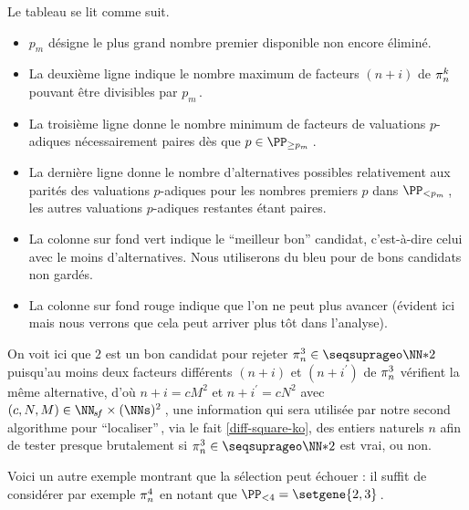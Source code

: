 Le tableau se lit comme suit.
%
\begin{itemize}
	\item $p_m$ désigne le plus grand nombre premier disponible non encore éliminé.

	\item La deuxième ligne indique le nombre maximum de facteurs $(n+i)$ de $\consprod$ pouvant être divisibles par $p_m$\,.

	\item La troisième ligne donne le nombre minimum de facteurs de valuations $p$-adiques nécessairement paires dès que $p \in \PP_{\geq p_m}$\,.

	\item La dernière ligne donne le nombre d'alternatives possibles relativement aux parités des valuations $p$-adiques pour les nombres premiers $p$ dans $\PP_{< p_m}$\,, les autres valuations $p$-adiques restantes étant paires.

	\item La colonne sur fond vert indique le \enquote{meilleur bon} candidat, c'est-à-dire celui avec le moins d'alternatives.
	Nous utiliserons du bleu pour de bons candidats non gardés.

	\item La colonne sur fond rouge indique que l'on ne peut plus avancer (évident ici mais nous verrons que cela peut arriver plus tôt dans l'analyse).
\end{itemize}


On voit ici que $2$ est un bon candidat pour rejeter $\consprod<3> \in \NNssquare$ puisqu'au moins deux facteurs différents $(n+i)$ et $(n+i^\prime)$ de $\consprod<3>$ vérifient la même alternative, d'où $n+i = c M^2$ et $n+i^\prime = c N^2$ avec $(c, N, M) \in \NNsf \times ( \NNs )^2$\,, une information qui sera utilisée par notre second algorithme pour \enquote{localiser}\,, via le fait \ref{diff-square-ko}, des entiers naturels $n$ afin de tester presque brutalement si $\consprod<3> \in \NNssquare$ est vrai, ou non.




\medskip

Voici un autre exemple montrant que la sélection peut échouer : il suffit de considérer par exemple $\consprod<4>$ en notant que $\PP_{< 4} = \setgene{2, 3}$\,.

\begin{center}
\end{center}




